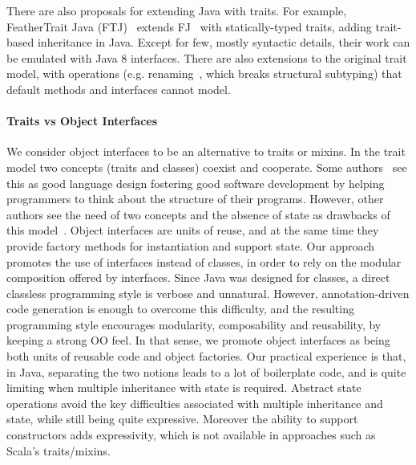 There are also proposals for extending Java with traits. For
example, FeatherTrait Java (FTJ)~\cite{Liquori08ftj} extends
FJ~\cite{Igarashi01FJ} with statically-typed traits, adding trait-based
inheritance in Java.  Except for few, mostly syntactic details, their work can
be emulated with Java 8 interfaces. There are also extensions to the original
trait model, with operations (e.g. renaming~\cite{reppy2006foundation}, which breaks
structural subtyping) that default methods and interfaces cannot
model.

\paragraph{Traits vs Object Interfaces}
We consider object interfaces to be an alternative to traits or mixins.  In the
trait model two concepts (traits and classes) coexist and cooperate. Some
authors~\cite{BettiniDSS13} see this as good language design fostering good
software development by helping programmers to think about the structure of
their programs.  However, other authors see the need of two concepts and the
absence of state as drawbacks of this model~\cite{malayeri2009cz}.  Object
interfaces are units of reuse, and at the same time they provide factory methods
for instantiation and support state.  Our approach promotes the use of
interfaces instead of classes, in order to rely on the modular composition
offered by interfaces. Since Java was designed for classes, a direct classless
programming style is verbose and unnatural. However, annotation-driven code
generation is enough to overcome this difficulty, and the resulting programming
style encourages modularity, composability and reusability, by keeping a strong
OO feel. In that sense, we promote object interfaces as being both units of
reusable code and object factories. Our practical experience is that, in Java,
separating the two notions leads to a lot of boilerplate code, and is quite
limiting when multiple inheritance with state is required.  Abstract state
operations avoid the key difficulties associated with multiple inheritance and
state, while still being quite expressive.  Moreover the ability to support
constructors adds expressivity, which is not available in approaches
such as Scala's traits/mixins.




